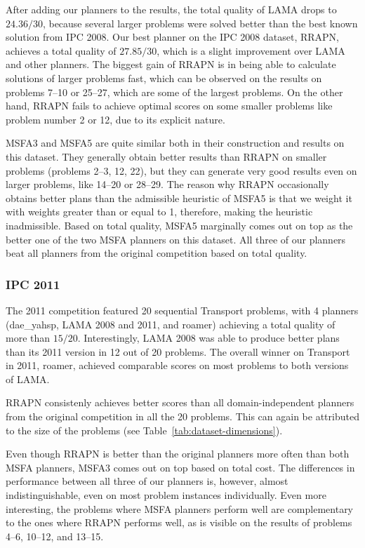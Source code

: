 After adding our planners to the results,
the total quality of LAMA drops to $24.36/30$,
because several larger problems were solved better than the
best known solution from IPC 2008.
Our best planner on the IPC 2008 dataset, RRAPN, achieves a total quality of $27.85/30$,
which is a slight improvement over LAMA and other planners. The biggest gain of RRAPN is in being able to calculate
solutions of larger problems fast, which can be observed on
the results on problems 7--10 or 25--27,
which are some of the largest problems.
On the other hand, RRAPN fails to achieve optimal scores
on some smaller problems like problem number 2 or 12,
due to its explicit nature.

MSFA3 and MSFA5 are quite similar both in their construction and results on this dataset.
They generally obtain better results than RRAPN on smaller problems
(problems 2--3, 12, 22),
but they can generate very good results even on larger problems,
like 14--20 or 28--29.
The reason why RRAPN occasionally obtains better plans than the
admissible heuristic of MSFA5 is that we weight it
with weights greater than or equal to 1,
therefore, making the heuristic inadmissible.
Based on total quality, MSFA5 marginally comes out on top as the better one of the two MSFA planners on this dataset.
All three of our planners beat all planners from the original competition based on total quality.

\subsubsection{IPC 2011}

The 2011 competition featured 20 sequential Transport problems,
with 4 planners (dae\_yahsp, LAMA 2008 and 2011, and roamer) achieving a total quality of more than $15/20$.
Interestingly, LAMA 2008 was able to produce better plans than its 2011 version in 12 out of 20 problems. The overall winner on Transport in 2011, roamer, achieved comparable scores on most problems to both versions of LAMA.

RRAPN consistenly achieves better scores than all domain-independent planners from the original competition in all the 20 problems. This can again be attributed to the size
of the problems (see Table~\ref{tab:dataset-dimensions}).

Even though RRAPN is better than the original planners more often than both MSFA planners,
MSFA3 comes out on top based on total cost.
The differences in performance between all three of our planners
is, however, almost indistinguishable, even on most problem instances individually.
Even more interesting, the problems
where MSFA planners perform well are complementary to the ones where RRAPN performs well,
as is visible on the results of problems 4--6, 10--12, and 13--15.

